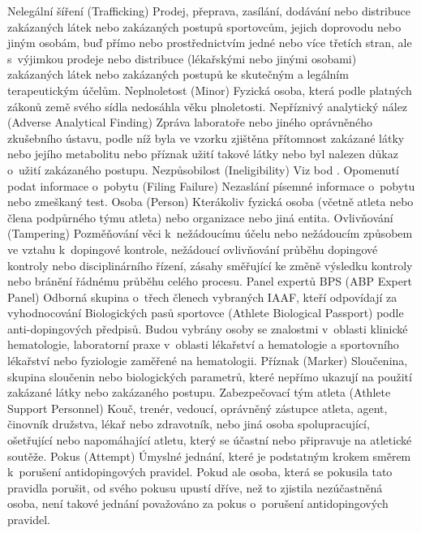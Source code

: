 \dend
\dt Nelegální šíření (Trafficking)
\dd Prodej, přeprava, zasílání, dodávání nebo distribuce zakázaných látek nebo zakázaných postupů sportovcům, jejich doprovodu nebo jiným osobám, buď přímo nebo prostřednictvím jedné nebo více třetích stran, ale s~výjimkou prodeje nebo distribuce (lékařskými nebo jinými osobami) zakázaných látek nebo zakázaných postupů ke skutečným a legálním terapeutickým účelům.
\dend
\dt Neplnoletost (Minor)
\dd Fyzická osoba, která podle platných zákonů země svého sídla nedosáhla věku plnoletosti.
\dend
\dt Nepříznivý analytický nález (Adverse Analytical Finding)
\dd Zpráva laboratoře nebo jiného oprávněného zkušebního ústavu, podle níž byla ve vzorku zjištěna přítomnost zakázané látky nebo jejího metabolitu nebo příznak užití takové látky nebo byl nalezen důkaz o~užití zakázaného postupu.
\dend
\dt Nezpůsobilost (Ineligibility)
\dd Viz bod .
\dend
\dt Opomenutí podat informace o~pobytu (Filing Failure)
\dd Nezaslání písemné informace o~pobytu nebo zmeškaný test.
\dend
\dt Osoba (Person)
\dd Kterákoliv fyzická osoba (včetně atleta nebo člena podpůrného týmu atleta) nebo organizace nebo jiná entita.
\dend
\dt Ovlivňování (Tampering)
\dd Pozměňování věci k~nežádoucímu účelu nebo nežádoucím způsobem ve vztahu k~dopingové kontrole, nežádoucí ovlivňování průběhu dopingové kontroly nebo disciplinárního řízení, zásahy směřující ke změně výsledku kontroly nebo bránění řádnému průběhu celého procesu.
\dend
\dt Panel expertů BPS (ABP Expert Panel)
\dd Odborná skupina o~třech členech vybraných IAAF, kteří odpovídají za vyhodnocování Biologických pasů sportovce (Athlete Biological Passport) podle anti-dopingových předpisů. Budou vybrány osoby se znalostmi v~oblasti klinické hematologie, laboratorní praxe v~oblasti lékařství a hematologie a sportovního lékařství nebo fyziologie zaměřené na hematologii.
\dend
\dt Příznak (Marker)
\dd Sloučenina, skupina sloučenin nebo biologických parametrů, které nepřímo ukazují na použití zakázané látky nebo zakázaného postupu.
\dend
\dt Zabezpečovací tým atleta (Athlete Support Personnel)
\dd Kouč, trenér, vedoucí, oprávněný zástupce atleta, agent, činovník družstva, lékař nebo zdravotník, nebo jiná osoba spolupracující, ošetřující nebo napomáhající atletu, který se účastní nebo připravuje na atletické soutěže.
\dend
\dt Pokus (Attempt)
\dd Úmyslné jednání, které je podstatným krokem směrem k~porušení antidopingových pravidel. Pokud  ale osoba, která se pokusila tato pravidla porušit, od svého pokusu upustí dříve, než to zjistila nezúčastněná osoba, není takové jednání považováno za pokus o~porušení antidopingových pravidel.
